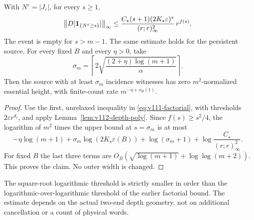 \begin{theorem}
\label{thm:v112-count}
With $N^\varepsilon=|J_\varepsilon|$, for every $s\ge1$,
\begin{equation}\label{eq:v112-count-tail}
 \bigl\|D[\mathbf1_{\{N^\varepsilon\ge s\}}]\bigr\|_\infty
 \le\frac{C_\star(s+1)(2K_\star\varepsilon)^s}
               {(r;r)_\infty^2}\,r^{f(s)}.
\end{equation}
The event is empty for $s>m-1$. The same estimate holds for the
persistent source. For every fixed $B$ and every $\eta>0$, take
\begin{equation}\label{eq:v112-root-log-count}
 \sigma_m=\left\lceil
       2\sqrt{\frac{(2+\eta)\log(m+1)}{\alpha}}\right\rceil.
\end{equation}
Then the source with at least $\sigma_m$ incidence witnesses has
zero $m^2$-normalized essential height, with finite-count rate
$m^{-\eta+o_B(1)}$.
\end{theorem}
\begin{proof}
Use the first, unrelaxed inequality in
\eqref{eq:v111-factorial}, with thresholds
$2\varepsilon r^{d_i}$, and apply Lemma~\ref{lem:v112-depth-poly}.
Since $f(s)\ge s^2/4$, the logarithm of $m^2$ times the upper bound
at $s=\sigma_m$ is at most
\[
 -\eta\log(m+1)
 +\sigma_m\log(2K_\star\varepsilon(B))
 +\log(\sigma_m+1)
 +\log\frac{C_\star}{(r;r)_\infty^2}.
\]
For fixed $B$ the last three terms are $O_B(\sqrt{\log(m+1)}
+\log\log(m+2))$. This proves the claim. No outer width is changed.
\end{proof}
The square-root logarithmic threshold is strictly smaller in order
than the logarithmic-over-logarithmic threshold of the earlier
factorial bound. The estimate depends on the actual two-end depth
geometry, not on additional cancellation or a count of physical words.

